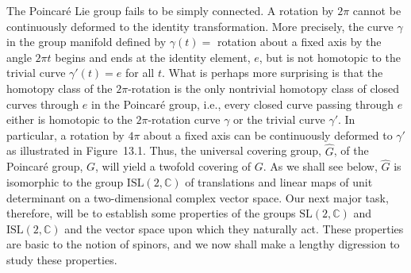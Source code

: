 The Poincar\'e Lie group fails to be simply connected. A rotation by \(2\pi\) cannot
be continuously deformed to the identity transformation. More precisely, the curve
\(\gamma\) in the group manifold defined by \(\gamma(t)=\) rotation about a fixed
axis by the angle \(2\pi t\) begins and ends at the identity element, \(e\), but is
not homotopic to the trivial curve \(\gamma'(t)=e\) for all \(t\). What is perhaps
more surprising is that the homotopy class of the \(2\pi\)-rotation is the only
nontrivial homotopy class of closed curves through \(e\) in the Poincar\'e group,
i.e., every closed curve passing through \(e\) either is homotopic to the
\(2\pi\)-rotation curve \(\gamma\) or the trivial curve \(\gamma'\). In particular, a
rotation by \(4\pi\) about a fixed axis can be continuously deformed to
\(\gamma'\) as illustrated in Figure~13.1. Thus, the universal covering group,
\(\widehat G\), of the Poincar\'e group, \(G\), will yield a twofold covering of
\(G\). As we shall see below, \(\widehat G\) is isomorphic to the group
\(\mathrm{ISL}(2,\mathbb C)\) of translations and linear maps of unit determinant on
a two-dimensional complex vector space. Our next major task, therefore, will be to
establish some properties of the groups \(\mathrm{SL}(2,\mathbb C)\) and
\(\mathrm{ISL}(2,\mathbb C)\) and the vector space upon which they naturally act.
These properties are basic to the notion of spinors, and we now shall make a lengthy
digression to study these properties.



